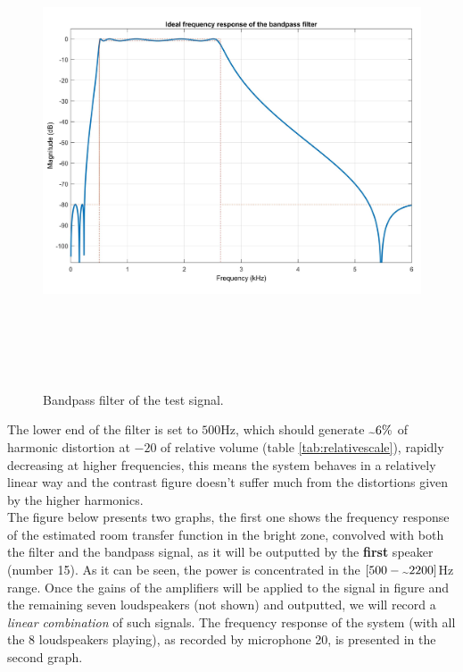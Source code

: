 \begin{figure}[H]
\centering
\includegraphics[width=14cm,height=14cm,keepaspectratio]{Figures/noise_bandpass}
\decoRule
\caption[Signal bandpass filter]{Bandpass filter of the test signal.}
\label{fig:noise_bandpass}
\end{figure}

The lower end of the filter is set to $500$Hz, which should generate $\tld 6\%$ of harmonic distortion at $-20$ of relative volume (table \ref{tab:relativescale}), rapidly decreasing at higher frequencies, this means the system behaves in a relatively linear way and the contrast figure doesn't suffer much from the distortions given by the higher harmonics.
\\
The figure below presents two graphs, the first one shows the frequency response of the estimated room transfer function in the bright zone, convolved with both the filter and the bandpass signal, as it will be outputted by the \textbf{first} speaker (number 15). As it can be seen, the power is concentrated in the $[500-\tld2200]$Hz range. Once the gains of the amplifiers will be applied to the signal in figure and the remaining seven loudspeakers (not shown) and outputted, we will record a \textit{linear combination} of such signals. The frequency response of the system (with all the 8 loudspeakers playing), as recorded by microphone 20, is presented in the second graph.

